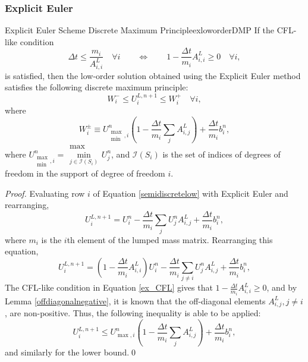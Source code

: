 \subsubsection{Explicit Euler}
\begin{theorem}{Explicit Euler Scheme Discrete Maximum Principle}{exloworderDMP}
If the CFL-like condition
\begin{equation}\label{ex_CFL}
   \Delta t \leq \frac{m_i}{A_{i,i}^L}\quad\forall i
   \qquad\Longleftrightarrow\qquad
   1 - \frac{\Delta t}{m_i}A_{i,i}^L \geq 0\quad\forall i,
\end{equation}
is satisfied, then the low-order solution obtained using the Explicit Euler
method satisfies the following discrete maximum principle:
\begin{equation}\label{explicit_max_principle}
   W_i^-\leq U_i^{L,n+1}\leq W_i^+\quad\forall i,
\end{equation}
where
\begin{equation}\label{ex_bounds}
   W_i^\pm\equiv U_{\substack{\max\\\min},i}^n\left(1-\frac{\Delta t}{m_i}
      \sum\limits_j A^L_{i,j}\right)
      + \frac{\Delta t}{m_i}b_i^n,
\end{equation}
where $U_{\substack{\max\\\min},i}^n =
\substack{\max\\\min\limits_{j\in \mathcal{I}(S_i)}}U_j^n$,
and $\mathcal{I}(S_i)$ is the set of indices of degrees of freedom in the
support of degree of freedom $i$.
\end{theorem}

\begin{proof}
Evaluating row $i$ of Equation \eqref{semidiscretelow} with Explicit Euler
and rearranging,
\[
   U_i^{L,n+1} = U_i^n - \frac{\Delta t}{m_i}\sum\limits_j U_j^n A^L_{i,j}
      + \frac{\Delta t}{m_i}b_i^n,
\]
where $m_i$ is the $i$th element of the lumped mass matrix.
Rearranging this equation,
\[
   U_i^{L,n+1} = \left(1-\frac{\Delta t}{m_i}A^L_{i,i}\right)U_i^n - \frac{\Delta t}{m_i}
      \sum\limits_{j\ne i} U_j^n A^L_{i,j} + \frac{\Delta t}{m_i}b_i^n,
\]
The CFL-like condition in Equation \eqref{ex_CFL} gives that $1-\frac{\Delta t}{m_i}A^L_{i,i} \ge 0$, and by
Lemma \ref{offdiagonalnegative}, it is known that the off-diagonal
elements $A^L_{i,j}, j\ne i$, are non-positive. Thus, the following inequality is
able to be applied:
\[
   U_i^{L,n+1} \le
   U_{\max,i}^n\left(1-\frac{\Delta t}{m_i}\sum\limits_j A^L_{i,j}\right)
      + \frac{\Delta t}{m_i}b_i^n,
\]
and similarly for the lower bound.\qed
\end{proof}
